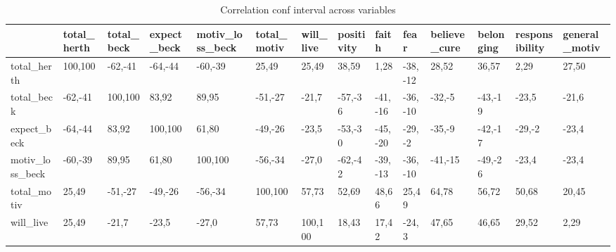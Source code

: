 \begin{table}[H] 
\tiny 
 \caption{Correlation conf interval across variables} 
 \label{correlation_conf_interval_across_variables} 
 \centering 
 \begin{adjustbox}{angle=270}  
 \begin{tabular} {|l|l|l|l|l|l|l|l|l|l|l|l|l|l|}  
 \hline 
  &  total\_herth & total\_beck & expect\_beck & motiv\_loss\_beck & total\_motiv & will\_live & positivity & faith & fear & believe\_cure & belonging & responsibility & general\_motiv \\ 
 \hline 
 total\_herth & {\color{green}100,100} & {\color{red}-62,-41} & {\color{red}-64,-44} & {\color{red}-60,-39} & {\color{green}25,49} & {\color{green}25,49} & {\color{green}38,59} & {\color{green}1,28} & {\color{red}-38,-12} & {\color{green}28,52} & {\color{green}36,57} & {\color{green}2,29} & {\color{green}27,50} \\ 
 \hline 
 total\_beck & {\color{red}-62,-41} & {\color{green}100,100} & {\color{green}83,92} & {\color{green}89,95} & {\color{red}-51,-27} & -21,7 & {\color{red}-57,-36} & {\color{red}-41,-16} & {\color{red}-36,-10} & {\color{red}-32,-5} & {\color{red}-43,-19} & -23,5 & -21,6 \\ 
 \hline 
 expect\_beck & {\color{red}-64,-44} & {\color{green}83,92} & {\color{green}100,100} & {\color{green}61,80} & {\color{red}-49,-26} & -23,5 & {\color{red}-53,-30} & {\color{red}-45,-20} & {\color{red}-29,-2} & {\color{red}-35,-9} & {\color{red}-42,-17} & {\color{red}-29,-2} & -23,4 \\ 
 \hline 
 motiv\_loss\_beck & {\color{red}-60,-39} & {\color{green}89,95} & {\color{green}61,80} & {\color{green}100,100} & {\color{red}-56,-34} & -27,0 & {\color{red}-62,-42} & {\color{red}-39,-13} & {\color{red}-36,-10} & {\color{red}-41,-15} & {\color{red}-49,-26} & -23,4 & -23,4 \\ 
 \hline 
 total\_motiv & {\color{green}25,49} & {\color{red}-51,-27} & {\color{red}-49,-26} & {\color{red}-56,-34} & {\color{green}100,100} & {\color{green}57,73} & {\color{green}52,69} & {\color{green}48,66} & {\color{green}25,49} & {\color{green}64,78} & {\color{green}56,72} & {\color{green}50,68} & {\color{green}20,45} \\ 
 \hline 
 will\_live & {\color{green}25,49} & -21,7 & -23,5 & -27,0 & {\color{green}57,73} & {\color{green}100,100} & {\color{green}18,43} & {\color{green}17,42} & -24,3 & {\color{green}47,65} & {\color{green}46,65} & {\color{green}29,52} & {\color{green}2,29} \\ 

\end{tabular}
\end{adjustbox}
\end{table}
